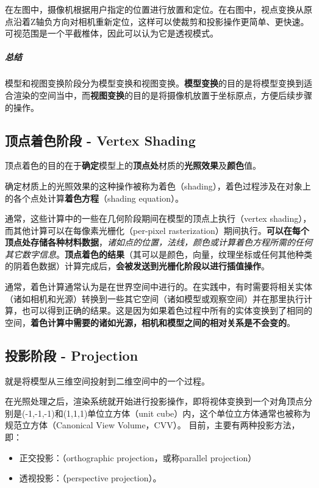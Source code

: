 \documentclass[UTF8,a4paper,12pt]{ctexbook}
\begin{document}
			在左图中，摄像机根据用户指定的位置进行放置和定位。在右图中，视点变换从原点沿着Z轴负方向对相机重新定位，这样可以使裁剪和投影操作更简单、更快速。可视范围是一个平截椎体，因此可以认为它是透视模式。	
			
			\subparagraph{总结}模型和视图变换阶段分为模型变换和视图变换。\textbf{模型变换}的目的是将模型变换到适合渲染的空间当中，而\textbf{视图变换}的目的是将摄像机放置于坐标原点，方便后续步骤的操作。
			
		\subsection{顶点着色阶段 - Vertex Shading} 
			顶点着色的目的在于\textbf{确定}模型上的\textbf{顶点处}材质的\textbf{光照效果}及\textbf{颜色}值。
			
			\color{blue}确定材质上的光照效果的这种操作被称为着色（shading），\color{black}着色过程涉及在对象上的各个点处计算\textbf{着色方程}（shading equation）。
			
			通常，这些计算中的一些在几何阶段期间在模型的顶点上执行（vertex shading），而其他计算可以在每像素光栅化（per-pixel rasterization）期间执行。\textbf{可以在每个顶点处存储各种材料数据}，\textit{诸如点的位置，法线，颜色或计算着色方程所需的任何其它数字信息}。\color{red}\textbf{顶点着色的结果}（其可以是颜色，向量，纹理坐标或任何其他种类的阴着色数据）计算完成后，\textbf{会被发送到光栅化阶段以进行插值操作}。\color{black}
			
			通常，着色计算通常认为是在世界空间中进行的。在实践中，有时需要将相关实体（诸如相机和光源）转换到一些其它空间（诸如模型或观察空间）并在那里执行计算，也可以得到正确的结果。这是因为如果着色过程中所有的实体变换到了相同的空间，\textbf{着色计算中需要的诸如光源，相机和模型之间的相对关系是不会变的}。
			
		\subsection{投影阶段 - Projection} 
			就是将模型从三维空间投射到二维空间中的一个过程。
			
			在光照处理之后，渲染系统就开始进行投影操作，即将视体变换到一个对角顶点分别是(-1,-1,-1)和(1,1,1)单位立方体（unit cube）内，这个单位立方体通常也被称为规范立方体（Canonical View Volume，CVV）。
			目前，主要有两种投影方法，即：
			\begin{itemize}
				\item 正交投影：（orthographic projection，或称parallel projection）
				\item 透视投影：（perspective projection）。
			\end{itemize}
			
\end{document}

